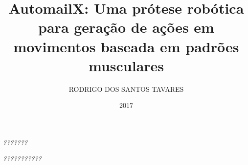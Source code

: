 \documentclass[
    12pt,       %
    oneside,    %
    a4paper,    %
%
    chapter=TITLE,	  	  %
%
    english,			  %
    brazil				  %
%
]{abntex2}
\title{AutomailX\todo{Alterar o título}: Uma prótese robótica para geração de ações em movimentos baseada em padrões musculares}
\author{RODRIGO DOS SANTOS TAVARES}
\date{2017}
\begin{document}
\frenchspacing


\imprimircapa{}

\imprimirfolhaderosto{}

\imprimirfolhadeaprovacao{}

\begin{dedicatoria}
   \vspace*{\fill}
   \centering
   \noindent
   \textit{???????} \vspace*{\fill}%
\end{dedicatoria}

\begin{agradecimentos}
  \textcolor{red}{\lipsum[1]}%
\end{agradecimentos}

\begin{epigrafe}
    \vspace*{\fill}
	\begin{flushright}
		\textit{???????????} %
	\end{flushright}
\end{epigrafe}
\end{document}
